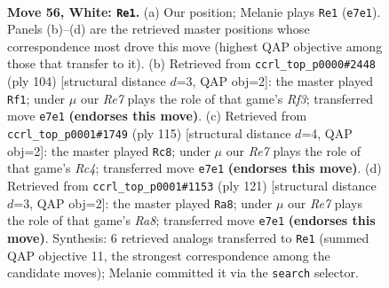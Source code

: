 \documentclass[11pt]{article}
\begin{document}
\clearpage

\begin{figure}[p]\centering
\begin{subfigure}{0.46\textwidth}\centering
\resizebox{\linewidth}{!}{%
\newchessgame
\chessboard[
  setfen={5r1k/4R3/8/P7/8/7K/8/8 w - - 15 56},
  showmover=false,
  pgfstyle=straightmove, color=movearrow, markmove={e7-e1}
]}
\caption{}
\end{subfigure}\hfill
\begin{subfigure}{0.46\textwidth}\centering
\resizebox{\linewidth}{!}{%
\newchessgame
\chessboard[
  setfen={8/8/p7/6K1/1P1k4/5R2/3r4/8 w - - 0 53},
  showmover=false,
  pgfstyle=straightmove, color=movearrow, markmove={f3-f1}
]}
\caption{}
\end{subfigure}
\\[4pt]
\begin{subfigure}{0.46\textwidth}\centering
\resizebox{\linewidth}{!}{%
\newchessgame
\chessboard[
  setfen={8/7p/4k2P/2r5/3R1K2/8/8/8 b - - 7 58},
  showmover=false,
  pgfstyle=straightmove, color=movearrow, markmove={c5-c8}
]}
\caption{}
\end{subfigure}\hfill
\begin{subfigure}{0.46\textwidth}\centering
\resizebox{\linewidth}{!}{%
\newchessgame
\chessboard[
  setfen={8/8/7p/3k4/6P1/8/4R1K1/r7 b - - 8 61},
  showmover=false,
  pgfstyle=straightmove, color=movearrow, markmove={a1-a8}
]}
\caption{}
\end{subfigure}
\caption{\textbf{Move 56, White: \texttt{Re1}.} (a) Our position; Melanie plays \texttt{Re1} (\texttt{e7e1}). Panels (b)--(d) are the retrieved master positions whose correspondence most drove this move (highest QAP objective among those that transfer to it). (b) Retrieved from \texttt{ccrl\_top\_p0000\#2448} (ply 104) [structural distance $d$=3, QAP obj=2]: the master played \texttt{Rf1}; under $\mu$ our \emph{Re7} plays the role of that game's \emph{Rf3}; transferred move \texttt{e7e1} \textbf{(endorses this move)}. (c) Retrieved from \texttt{ccrl\_top\_p0001\#1749} (ply 115) [structural distance $d$=4, QAP obj=2]: the master played \texttt{Rc8}; under $\mu$ our \emph{Re7} plays the role of that game's \emph{Rc4}; transferred move \texttt{e7e1} \textbf{(endorses this move)}. (d) Retrieved from \texttt{ccrl\_top\_p0001\#1153} (ply 121) [structural distance $d$=3, QAP obj=2]: the master played \texttt{Ra8}; under $\mu$ our \emph{Re7} plays the role of that game's \emph{Ra8}; transferred move \texttt{e7e1} \textbf{(endorses this move)}. Synthesis: 6 retrieved analogs transferred to \texttt{Re1} (summed QAP objective 11, the strongest correspondence among the candidate moves); Melanie committed it via the \texttt{search} selector.}
\label{fig:thought-m110}
\end{figure}
\end{document}
